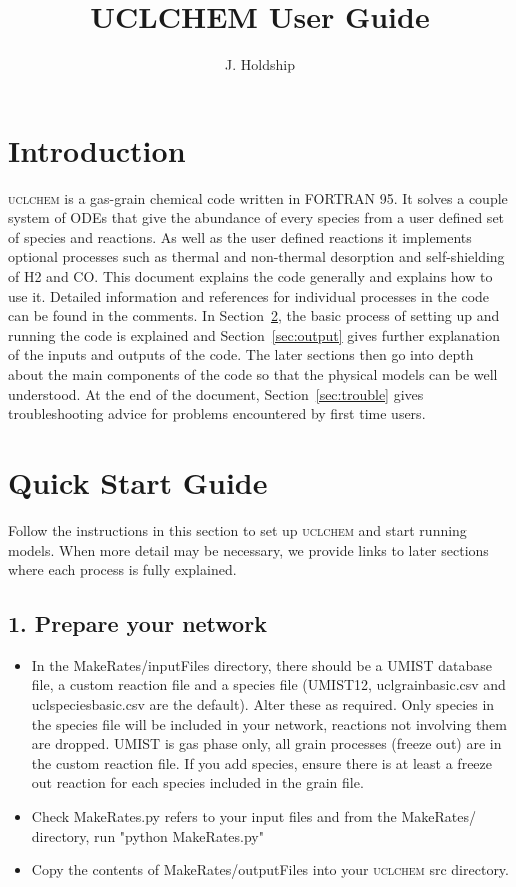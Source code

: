 \documentclass{llncs}
\begin{document}
\title{UCLCHEM User Guide}
\author{J. Holdship}

\maketitle

\section{Introduction}
\textsc{uclchem} is a gas-grain chemical code written in FORTRAN 95. It solves a couple system of ODEs that give the abundance of every species from a user defined set of species and reactions. As well as the user defined reactions it implements optional processes such as thermal and non-thermal desorption and self-shielding of H2 and CO. This document explains the code generally and explains how to use it. Detailed information and references for individual processes in the code can be found in the comments. In Section~\ref{sec:quick}, the basic process of setting up and running the code is explained and Section~\ref{sec:output} gives further explanation of the inputs and outputs of the code. The later sections then go into depth about the main components of the code so that the physical models can be well understood. At the end of the document, Section~\ref{sec:trouble} gives troubleshooting advice for problems encountered by first time users.

\section{Quick Start Guide}
\label{sec:quick}
Follow the instructions in this section to set up \textsc{uclchem} and start running models. When more detail may be necessary, we provide links to later sections where each process is fully explained.
%
\subsection{1. Prepare your network}
\begin{itemize}
\item In the MakeRates/inputFiles directory, there should be a UMIST database file, a custom reaction file and a species file (UMIST12, uclgrainbasic.csv and uclspeciesbasic.csv are the default). Alter these as required. Only species in the species file will be included in your network, reactions not involving them are dropped. UMIST is gas phase only, all grain processes (freeze out) are in the custom reaction file. If you add species, ensure there is at least a freeze out reaction for each species included in the grain file.
\item Check MakeRates.py refers to your input files and from the MakeRates/ directory, run "python MakeRates.py"
\item Copy the contents of MakeRates/outputFiles into your \textsc{uclchem} src directory.
\end{itemize}
%
\end{document}
